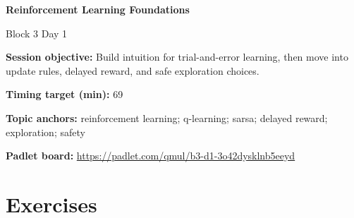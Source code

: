 \documentclass[11pt]{article}
\begin{document}
\begin{center}\LARGE\bfseries Reinforcement Learning Foundations\end{center}

\begin{center}\large Block 3 Day 1\end{center}

\begin{tcolorbox}[colback=MidnightBlue!4,colframe=MidnightBlue,title={Session Overview},fonttitle=\bfseries,breakable]
\textbf{Session objective:} Build intuition for trial-and-error learning, then move into update rules, delayed reward, and safe exploration choices.

\textbf{Timing target (min):} 69

\textbf{Topic anchors:} reinforcement learning; q-learning; sarsa; delayed reward; exploration; safety

\textbf{Padlet board:} \url{https://padlet.com/qmul/b3-d1-3o42dysklnb5eeyd}
\end{tcolorbox}

\section*{Exercises}
\end{document}
